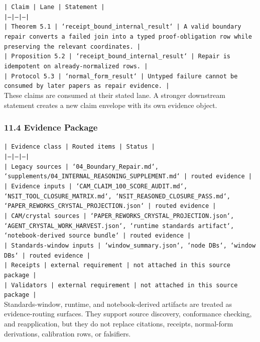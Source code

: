 \documentclass[11pt]{article}
\begin{document}
\noindent\texttt{| Claim | Lane | Statement |}\\
\noindent\texttt{|---|---|---|}\\
\noindent\texttt{| Theorem 5.1 | `receipt\_bound\_internal\_result` | A valid boundary repair converts a failed join into a typed proof-obligation row while preserving the relevant coordinates. |}\\
\noindent\texttt{| Proposition 5.2 | `receipt\_bound\_internal\_result` | Repair is idempotent on already-normalized rows. |}\\
\noindent\texttt{| Protocol 5.3 | `normal\_form\_result` | Untyped failure cannot be consumed by later papers as repair evidence. |}\\

These claims are consumed at their stated lane. A stronger downstream statement
creates a new claim envelope with its own evidence object.

\subsubsection*{11.4 Evidence Package}

\noindent\texttt{| Evidence class | Routed items | Status |}\\
\noindent\texttt{|---|---|---|}\\
\noindent\texttt{| Legacy sources | `04\_Boundary\_Repair.md`, `supplements/04\_INTERNAL\_REASONING\_SUPPLEMENT.md` | routed evidence |}\\
\noindent\texttt{| Evidence inputs | `CAM\_CLAIM\_100\_SCORE\_AUDIT.md`, `NSIT\_TOOL\_CLOSURE\_MATRIX.md`, `NSIT\_REASONED\_CLOSURE\_PASS.md`, `PAPER\_REWORKS\_CRYSTAL\_PROJECTION.json` | routed evidence |}\\
\noindent\texttt{| CAM/crystal sources | `PAPER\_REWORKS\_CRYSTAL\_PROJECTION.json`, `AGENT\_CRYSTAL\_WORK\_HARVEST.json`, `runtime standards artifact`, `notebook-derived source bundle` | routed evidence |}\\
\noindent\texttt{| Standards-window inputs | `window\_summary.json`, `node DBs`, `window DBs` | routed evidence |}\\
\noindent\texttt{| Receipts | external requirement | not attached in this source package |}\\
\noindent\texttt{| Validators | external requirement | not attached in this source package |}\\

Standards-window, runtime, and notebook-derived artifacts are treated
as evidence-routing surfaces. They support source discovery, conformance
checking, and reapplication, but they do not replace citations, receipts,
normal-form derivations, calibration rows, or falsifiers.
\end{document}
